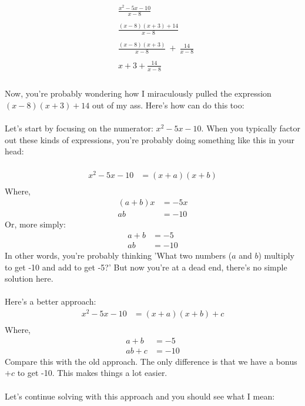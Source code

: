 \documentclass[12pt]{article}
\begin{document}
\begin{align*}
  &\frac{x^2 -5x - 10}{x-8} \\
  \\
  &\frac{(x-8)(x+3)+14}{x-8} \\
  \\
  &\frac{(x-8)(x+3)}{x-8} \ + \ \frac{14}{x-8} \\
  \\
  & x + 3 + \frac{14}{x-8} \\
\end{align*}
\newblock
\\
Now, you're probably wondering how I miraculously pulled the expression $(x-8)(x+3)+14$ out of my ass. Here's how can do this too:
\\ \\
Let's start by focusing on the numerator: $x^2 - 5x - 10$.
When you typically factor out these kinds of expressions, you're probably doing something like this in your head:
\\ \\
\begin{align*}
  x^2 - 5x -10 &= (x+a)(x+b) \\
\end{align*}
\newblock
Where, \\
\begin{align*}
  (a+b)x &= -5x \\
  ab &= -10
\end{align*}
Or, more simply:
\begin{align*}
  a+b &= -5 \\
  ab &= -10
\end{align*}
In other words, you're probably thinking 'What two numbers ($a$ and $b$) multiply to get -10 and add to get -5?'
But now you're at a dead end, there's no simple solution here.
\\ \\
Here's a better approach:
\begin{align*}
  x^2 - 5x -10 &= (x+a)(x+b)+c \\
\end{align*}
\newblock
Where,
\begin{align*}
  a+b &= -5 \\
  ab + c &= -10
\end{align*}
Compare this with the old approach. The only difference is that we have a bonus $+c$ to get -10. 
This makes things a lot easier.
\\ \\
Let's continue solving with this approach and you should see what I mean:
\end{document}
